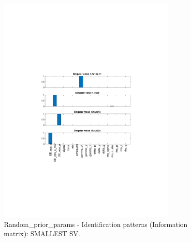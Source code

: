 
\begin{figure}[H]
\centering 
\includegraphics[width=0.8\textwidth]{monetary/identification/monetary_ident_pattern_Random_prior_params_1}
\caption{Random_prior_params - Identification patterns (Information matrix): SMALLEST SV.}\label{Fig:ident_pattern:Random_prior_params:1}
\end{figure}

